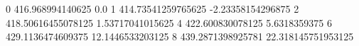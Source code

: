 0 416.968994140625 0.0
1 414.73541259765625 -2.23358154296875
2 418.50616455078125 1.53717041015625
4 422.600830078125 5.6318359375
6 429.1136474609375 12.1446533203125
8 439.2871398925781 22.318145751953125
